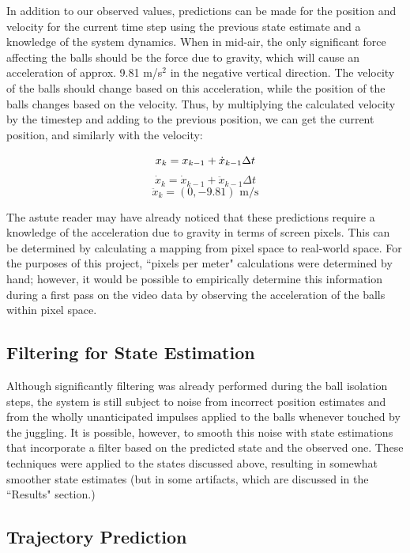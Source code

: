 \documentclass[letterpaper, 10 pt, conference]{ieeeconf}  %
\begin{document}
In addition to our observed values, predictions can be made for the position and velocity for the current time step using the previous state estimate and a knowledge of the system dynamics. When in mid-air, the only significant force affecting the balls should be the force due to gravity, which will cause an acceleration of approx. 9.81 m/s$^{2}$ in the negative vertical direction. The velocity of the balls should change based on this acceleration, while the position of the balls changes based on the velocity. Thus, by multiplying the calculated velocity by the timestep and adding to the previous position, we can get the current position, and similarly with the velocity:

\[
x_{k} = x_{k-1} + \dot{x}_{k-1} \Delta t \\ \\
\]
\[
\dot{x}_{k} = \dot{x}_{k-1} + \ddot{x}_{k-1} \Delta t
\]
\[
\ddot{x}_{k} = (0, -9.81) \text{ m/s}
\]

The astute reader may have already noticed that these predictions require a knowledge of the acceleration due to gravity in terms of screen pixels. This can be determined by calculating a mapping from pixel space to real-world space. For the purposes of this project, ``pixels per meter" calculations were determined by hand; however, it would be possible to empirically determine this information during a first pass on the video data by observing the acceleration of the balls within pixel space.

\subsection{Filtering for State Estimation}

Although significantly filtering was already performed during the ball isolation steps, the system is still subject to noise from incorrect position estimates and from the wholly unanticipated impulses applied to the balls whenever touched by the juggling. It is possible, however, to smooth this noise with state estimations that incorporate a filter based on the predicted state and the observed one. These techniques were applied to the states discussed above, resulting in somewhat smoother state estimates (but in some artifacts, which are discussed in the ``Results" section.)

\subsection{Trajectory Prediction}
\end{document}
